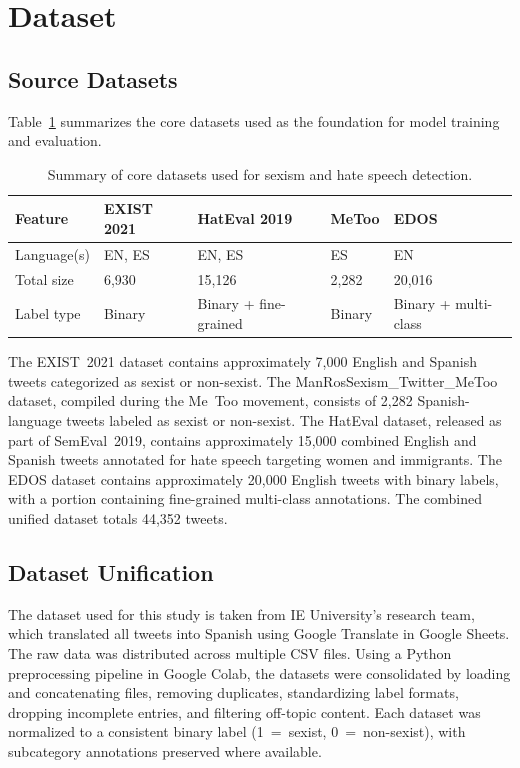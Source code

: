 \documentclass[runningheads]{llncs}
\begin{document}
\section{Dataset}

\subsection{Source Datasets}

Table~\ref{tab:datasets} summarizes the core datasets used as the foundation for model
training and evaluation.

\begin{table}[h]
\caption{Summary of core datasets used for sexism and hate speech detection.}
\label{tab:datasets}
\centering
\begin{tabular}{lllll}
\toprule
\textbf{Feature} & \textbf{EXIST 2021} & \textbf{HatEval 2019} & \textbf{MeToo} & \textbf{EDOS} \\
\midrule
Language(s) & EN, ES & EN, ES & ES & EN \\
Total size & 6,930 & 15,126 & 2,282 & 20,016 \\
Label type & Binary & Binary + fine-grained & Binary & Binary + multi-class \\
\bottomrule
\end{tabular}
\end{table}

The EXIST~2021 dataset contains approximately 7,000 English and Spanish tweets
categorized as sexist or non-sexist. The ManRosSexism\_Twitter\_MeToo dataset,
compiled during the Me~Too movement, consists of 2,282 Spanish-language tweets
labeled as sexist or non-sexist. The HatEval dataset, released as part of SemEval~2019,
contains approximately 15,000 combined English and Spanish tweets annotated for hate
speech targeting women and immigrants. The EDOS dataset contains approximately
20,000 English tweets with binary labels, with a portion containing fine-grained
multi-class annotations. The combined unified dataset totals 44,352 tweets.

\subsection{Dataset Unification}

The dataset used for this study is taken from IE University's research team, which
translated all tweets into Spanish using Google Translate in Google Sheets. The raw
data was distributed across multiple CSV files. Using a Python preprocessing pipeline
in Google Colab, the datasets were consolidated by loading and concatenating files,
removing duplicates, standardizing label formats, dropping incomplete entries, and
filtering off-topic content. Each dataset was normalized to a consistent binary label
(1~=~sexist, 0~=~non-sexist), with subcategory annotations preserved where available.
\end{document}
